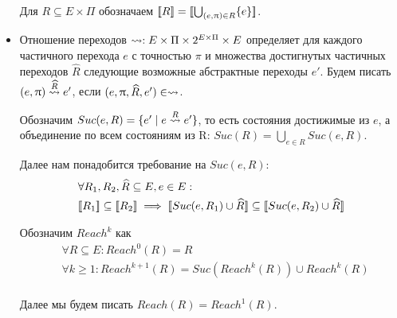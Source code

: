 \begin{itemize}
Для $R \subseteq E \times \Pi$ обозначаем
$[\![ R ]\!] = [\![ \bigcup_{(e,\uppi)\in R}\{e\} ]\!]$.

\item Отношение переходов $\leadsto: E\times \Pi \times 2^{E\times \Pi} \times E $ определяет для каждого частичного перехода $e$ с точностью $\pi$ и множества достигнутых частичных переходов $\widehat{R}$ следующие возможные абстрактные переходы $e'$.
Будем писать $(e, \uppi) \stackrel{\widehat{R}}{\leadsto} e'$, если $(e, \uppi, \widehat{R}, e') \in \leadsto$.


Обозначим $Suc(e, R) = \{e' \mid e \stackrel{R}{\leadsto} e'\}$, то есть состояния достижимые из $e$, а объединение по всем состояниям из R:
$Suc(R) = \bigcup_{e \in R}{Suc(e, R)}$.

Далее нам понадобится требование на $Suc(e, R)$:
\begin{equation}
\label{eq_suc}
\begin{aligned}
& \forall R_1, R_2, \widehat{R} \subseteq E, e \in E:\\
& \conc{R_1} \subseteq \conc{R_2} \implies \conc{Suc(e, R_1) \cup \widehat{R}} \subseteq \conc{Suc(e, R_2) \cup \widehat{R}} 
\end{aligned}
\end{equation}

Обозначим $Reach^k$ как
\begin{equation}
\label{reach_k}
\begin{aligned}
& \forall R \subseteq E: Reach^0(R) = R \\
& \forall k \ge 1: Reach^{k+1}(R) = Suc(Reach^k(R)) \cup Reach^{k}(R) \\
\end{aligned}
\end{equation}

Далее мы будем писать $Reach(R) = Reach^1(R)$. 

%


\end{itemize}
